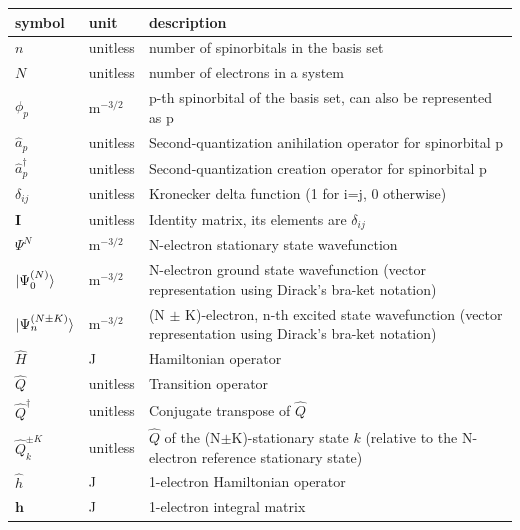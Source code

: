 \documentclass[12pt]{article}
\begin{document}
\renewcommand{\arraystretch}{1.2}
\noindent \begin{longtable*}{l l p{12cm}} \toprule
\textbf{symbol} & \textbf{unit} & \textbf{description}\\
\midrule 
$n$ & unitless & number of spinorbitals in the basis set\\
$N$ & unitless & number of electrons in a system\\
$\phi_p$ & $\si{\metre}^{-3/2}$ & p-th spinorbital of the basis set, 
can also be represented as p\\
$\hat{a}_p$ & unitless & Second-quantization anihilation operator for 
spinorbital p\\ 
$\hat{a}^\dagger_p$ & unitless & Second-quantization creation operator for 
spinorbital p\\ 
$\delta_{ij}$ & unitless & Kronecker delta function (1 for i=j, 0 otherwise)\\
$\mathbf{I}$ & unitless & Identity matrix, its elements are $\delta_{ij}$\\
$\Psi^{N}$ & $\si{\metre}^{-3/2}$ & N-electron stationary state wavefunction\\
$\ket{\Psi^{(N)}_0}$ & $\si{\metre}^{-3/2}$ & N-electron ground state 
wavefunction (vector representation using Dirack's bra-ket notation)\\
$\ket{\Psi^{(N \pm K)}_n}$ & $\si{\metre}^{-3/2}$ & (N $\pm$ K)-electron, n-th 
excited state wavefunction (vector representation using Dirack's bra-ket 
notation)\\
$\hat{H}$ & \si{\joule} & Hamiltonian operator\\
$\hat{Q}$ & unitless & Transition operator\\
$\hat{Q}^{\dagger}$ & unitless & Conjugate transpose of $\hat{Q}$\\
$\hat{Q}^{\pm K}_{k}$ & unitless & $\hat{Q}$ of the 
(N$\pm$K)-stationary state $k$ (relative to the N-electron reference 
stationary state)\\
$\hat{h}$ & \si{\joule} & 1-electron Hamiltonian operator\\
$\mathbf{h}$ & \si{\joule} & 1-electron integral matrix\\

\end{longtable*}
\end{document}

